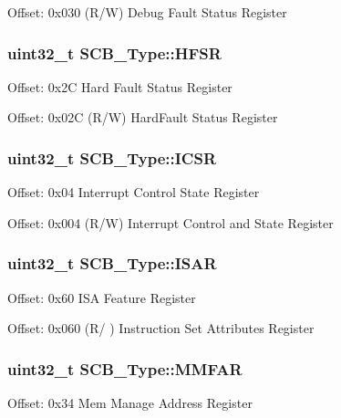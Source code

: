 Offset\-: 0x030 (R/\-W) Debug Fault Status Register \hypertarget{struct_s_c_b___type_a7bed53391da4f66d8a2a236a839d4c3d}{
\subsubsection[{H\-F\-S\-R}]{ uint32\-\_\-t S\-C\-B\-\_\-\-Type\-::\-H\-F\-S\-R}}\label{struct_s_c_b___type_a7bed53391da4f66d8a2a236a839d4c3d}
Offset\-: 0x2\-C Hard Fault Status Register

Offset\-: 0x02\-C (R/\-W) Hard\-Fault Status Register \hypertarget{struct_s_c_b___type_a3e66570ab689d28aebefa7e84e85dc4a}{
\subsubsection[{I\-C\-S\-R}]{ uint32\-\_\-t S\-C\-B\-\_\-\-Type\-::\-I\-C\-S\-R}}\label{struct_s_c_b___type_a3e66570ab689d28aebefa7e84e85dc4a}
Offset\-: 0x04 Interrupt Control State Register

Offset\-: 0x004 (R/\-W) Interrupt Control and State Register \hypertarget{struct_s_c_b___type_a84715ecbe885efa4841d594e7409ccae}{
\subsubsection[{I\-S\-A\-R}]{ uint32\-\_\-t S\-C\-B\-\_\-\-Type\-::\-I\-S\-A\-R}}\label{struct_s_c_b___type_a84715ecbe885efa4841d594e7409ccae}
Offset\-: 0x60 I\-S\-A Feature Register

Offset\-: 0x060 (R/ ) Instruction Set Attributes Register \hypertarget{struct_s_c_b___type_ac49b24b3f222508464f111772f2c44dd}{
\subsubsection[{M\-M\-F\-A\-R}]{ uint32\-\_\-t S\-C\-B\-\_\-\-Type\-::\-M\-M\-F\-A\-R}}\label{struct_s_c_b___type_ac49b24b3f222508464f111772f2c44dd}
Offset\-: 0x34 Mem Manage Address Register

